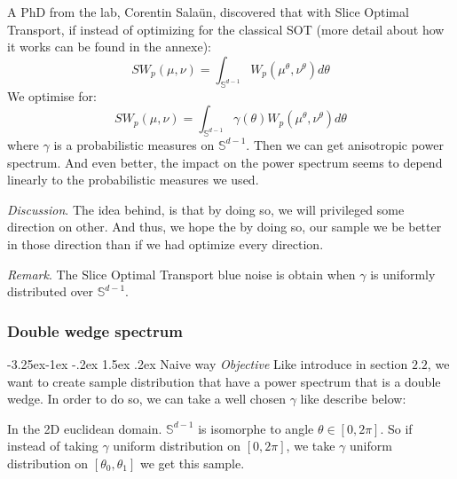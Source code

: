 \documentclass{classeENS}
\makeatletter
\newcounter{subsubsubsection}[subsubsection]
\newcommand\subsubsubsection{\@startsection{subsubsubsection}{4}{\z@}%
                                     {-3.25ex\@plus -1ex \@minus -.2ex}%
                                     {1.5ex \@plus .2ex}%
                                     {\normalfont\normalsize\bfseries}}
\makeatother
\begin{document}
\> A PhD from the lab, Corentin Salaün, discovered that with Slice Optimal Transport, 
if instead of optimizing for the classical SOT (more detail about how  it works can be found in the annexe):
\[SW_p(\mu, \nu) = \int_{\mathbb{S}^{d-1}} W_p(\mu^\theta,\nu^\theta) d\theta\]
We optimise for:
\[SW_p(\mu, \nu) = \int_{\mathbb{S}^{d-1}} \gamma(\theta) W_p(\mu^\theta,\nu^\theta) d\theta\]
where $\gamma$ is a probabilistic measures on $\mathbb{S}^{d-1}$. Then we can get anisotropic
power spectrum. And even better, the impact on the power spectrum seems to depend linearly to
the probabilistic measures we used.

\> \textit{Discussion}. The idea behind, is that by doing so, we will privileged some
    direction on other. And thus, we hope the by doing so, our sample we be better in
    those direction than if we had optimize every direction.
    
\> \textit{Remark}. The Slice Optimal Transport blue noise is obtain when 
    $\gamma$ is uniformly distributed over $\mathbb{S}^{d-1}$.

\subsubsection{Double wedge spectrum}

\subsubsubsection{Naive way}
\textit{Objective} Like introduce in section $2.2$, we want to create sample distribution
    that have a power spectrum that is a double wedge. In order to do so, we can take
    a well chosen $\gamma$ like describe below:

In the 2D euclidean domain. $\mathbb{S}^{d-1}$ is isomorphe to angle $\theta \in [0,2\pi]$.
So if instead of taking $\gamma$ uniform distribution on $[0,2\pi]$, we take $\gamma$
uniform distribution on $[\theta_0,\theta_1]$ we get this sample.
\end{document}
